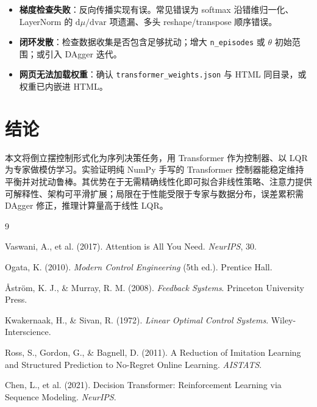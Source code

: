 \documentclass[11pt,a4paper]{article}
\begin{document}
\begin{itemize}
    \item \textbf{梯度检查失败}：反向传播实现有误。常见错误为 softmax 沿错维归一化、LayerNorm 的 $\mathrm d\mu/\mathrm d\mathrm{var}$ 项遗漏、多头 reshape/transpose 顺序错误。
    \item \textbf{闭环发散}：检查数据收集是否包含足够扰动；增大 \texttt{n\_episodes} 或 $\theta$ 初始范围；或引入 DAgger 迭代。
    \item \textbf{网页无法加载权重}：确认 \texttt{transformer\_weights.json} 与 HTML 同目录，或权重已内嵌进 HTML。
\end{itemize}

\section{结论}

本文将倒立摆控制形式化为序列决策任务，用 Transformer 作为控制器、以 LQR 为专家做模仿学习。实验证明纯 NumPy 手写的 Transformer 控制器能稳定维持平衡并对扰动鲁棒。其优势在于无需精确线性化即可拟合非线性策略、注意力提供可解释性、架构可平滑扩展；局限在于性能受限于专家与数据分布，误差累积需 DAgger 修正，推理计算量高于线性 LQR。

\begin{thebibliography}{9}

Vaswani, A., et al. (2017). Attention is All You Need. \emph{NeurIPS}, 30.

Ogata, K. (2010). \emph{Modern Control Engineering} (5th ed.). Prentice Hall.

Åström, K. J., \& Murray, R. M. (2008). \emph{Feedback Systems}. Princeton University Press.

Kwakernaak, H., \& Sivan, R. (1972). \emph{Linear Optimal Control Systems}. Wiley-Interscience.

Ross, S., Gordon, G., \& Bagnell, D. (2011). A Reduction of Imitation Learning and Structured Prediction to No-Regret Online Learning. \emph{AISTATS}.

Chen, L., et al. (2021). Decision Transformer: Reinforcement Learning via Sequence Modeling. \emph{NeurIPS}.

\end{thebibliography}
\end{document}
